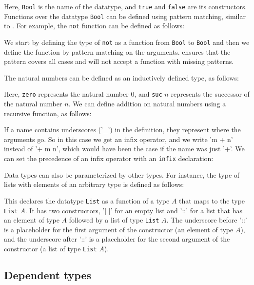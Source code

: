 \documentclass[titlepage]{article}
\begin{document}
Here, \texttt{Bool} is the name of the datatype, and \texttt{true} and \texttt{false} are its constructors. Functions over the datatype \texttt{Bool} can be defined using pattern matching, similar to \Haskell. For example, the \texttt{not} function can be defined as follows:

We start by defining the type of \texttt{not} as a function from \texttt{Bool} to \texttt{Bool} and then we define the function by pattern matching on the arguments. \Agda ensures that the pattern covers all cases and will not accept a function with missing patterns.

The natural numbers can be defined as an inductively defined type, as follows:

Here, \texttt{zero} represents the natural number $0$, and \texttt{suc} $n$ represents the successor of the natural number $n$. We can define addition on natural numbers using a recursive function, as follows:


If a name contains underscores ('\_') in the definition, they represent where the arguments go. So in this case we get an infix operator, and we write 'm + n' instead of '+ m n', which would have been the case if the name was just '+'. We can set the precedence of an infix operator with an \texttt{infix} declaration:


Data types can also be parameterized by other types. For instance, the type of lists with elements of an arbitrary type is defined as follows:

This declares the datatype \texttt{List} as a function of a type $A$ that maps to the type \texttt{List} $A$. It has two constructors, '[ ]' for an empty list and '::' for a list that has an element of type $A$ followed by a list of type \texttt{List} $A$. The underscore before '::' is a placeholder for the first argument of the constructor (an element of type $A$), and the underscore after '::' is a placeholder for the second argument of the constructor (a list of type \texttt{List} $A$).


\subsection{Dependent types}
\end{document}
